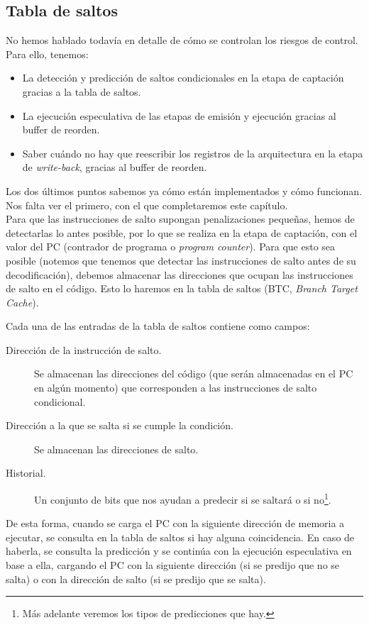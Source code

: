 \subsection{Tabla de saltos}
No hemos hablado todavía en detalle de cómo se controlan los riesgos de control. Para ello, tenemos:
\begin{itemize}
    \item La detección y predicción de saltos condicionales en la etapa de captación gracias a la tabla de saltos.
    \item La ejecución especulativa de las etapas de emisión y ejecución gracias al buffer de reorden.
    \item Saber cuándo no hay que reescribir los registros de la arquitectura en la etapa de \emph{write-back}, gracias al buffer de reorden.
\end{itemize}
Los dos últimos puntos sabemos ya cómo están implementados y cómo funcionan. Nos falta ver el primero, con el que completaremos este capítulo.\\

Para que las instrucciones de salto supongan penalizaciones pequeñas, hemos de detectarlas lo antes posible, por lo que se realiza en la etapa de captación, con el valor del PC (contrador de programa o \emph{program counter}).
Para que esto sea posible (notemos que tenemos que detectar las instrucciones de salto antes de su decodificación), debemos almacenar las direcciones que ocupan las instrucciones de salto en el código. Esto lo haremos en la tabla de saltos (BTC, \emph{Branch Target Cache}).

Cada una de las entradas de la tabla de saltos contiene como campos:
\begin{description}
    \item [Dirección de la instrucción de salto.] Se almacenan las direcciones del código (que serán almacenadas en el PC en algún momento) que corresponden a las instrucciones de salto condicional.
    \item [Dirección a la que se salta si se cumple la condición.] Se almacenan las direcciones de salto.
    \item [Historial.] Un conjunto de bits que nos ayudan a predecir si se saltará o si no\footnote{Más adelante veremos los tipos de predicciones que hay.}.
\end{description}
De esta forma, cuando se carga el PC con la siguiente dirección de memoria a ejecutar, se consulta en la tabla de saltos si hay alguna coincidencia. En caso de haberla, se consulta la predicción y se continúa con la ejecución especulativa en base a ella, cargando el PC con la siguiente dirección (si se predijo que no se salta) o con la dirección de salto (si se predijo que se salta). 

